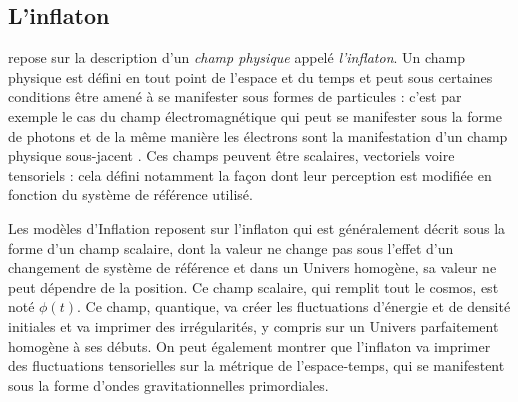 \subsection{L'inflaton}
 repose sur la description d'un \textit{champ physique} appelé \textit{l'inflaton}. Un champ physique est défini en tout point de l'espace et du temps et peut sous certaines conditions être amené à se manifester sous formes de particules : c'est par exemple le cas du champ électromagnétique qui peut se manifester sous la forme de photons et de la même manière les électrons sont la manifestation d'un champ physique sous-jacent . Ces champs peuvent être scalaires, vectoriels voire tensoriels : cela défini notamment la façon dont leur perception est modifiée en fonction du système de référence utilisé.

Les modèles d'Inflation reposent sur l'inflaton qui est généralement décrit sous la forme d'un champ scalaire, dont la valeur ne change pas sous l'effet d'un changement de système de référence et dans un Univers homogène, sa valeur ne peut dépendre de la position. Ce champ scalaire, qui remplit tout le cosmos, est noté $\phi(t)$. Ce champ, quantique, va créer les fluctuations d'énergie et de densité initiales et va imprimer des irrégularités, y compris sur un Univers parfaitement homogène à ses débuts. On peut également montrer que l'inflaton va imprimer des fluctuations tensorielles sur la métrique de l'espace-temps, qui se manifestent sous la forme d'ondes gravitationnelles primordiales.

